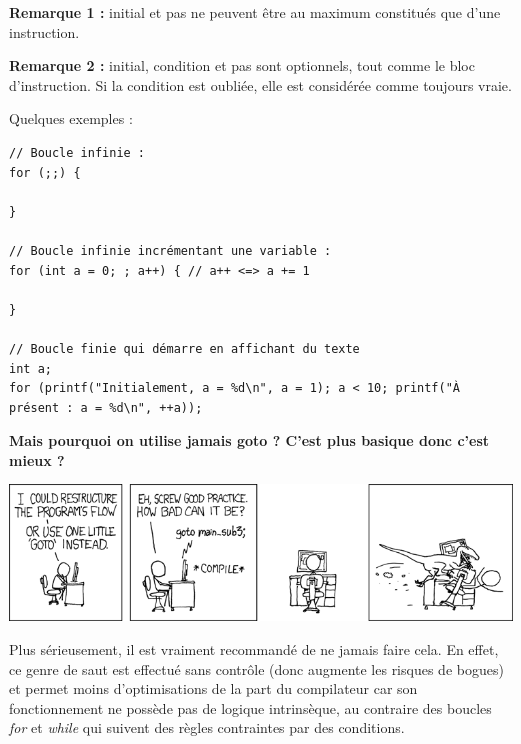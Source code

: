 \documentclass[../../../main.tex]{subfiles}
\begin{document}
\textbf{Remarque 1 :} \textsf{initial} et \textsf{pas} ne peuvent être au maximum constitués que d'une instruction.
 
\textbf{Remarque 2 :} \textsf{initial}, \textsf{condition} et \textsf{pas} sont optionnels, tout comme le bloc d'instruction. Si la condition est oubliée, elle est considérée comme toujours vraie.
 
Quelques exemples :
\begin{verbatim}
// Boucle infinie :
for (;;) {
	
}

// Boucle infinie incrémentant une variable :
for (int a = 0; ; a++) { // a++ <=> a += 1
	
}

// Boucle finie qui démarre en affichant du texte
int a;
for (printf("Initialement, a = %d\n", a = 1); a < 10; printf("À présent : a = %d\n", ++a));
\end{verbatim}
\textbf{Mais pourquoi on utilise jamais \textsf{goto} ? C'est plus basique donc c'est mieux ?}
 
\begin{minipage}{\textwidth}
	\begin{center}
		\includegraphics[width=\textwidth]{meme2}
	\end{center}
\end{minipage}
 
Plus sérieusement, il est vraiment recommandé de ne jamais faire cela. En effet, ce genre de saut est effectué sans contrôle (donc augmente les risques de bogues) et permet moins d'optimisations de la part du compilateur car son fonctionnement ne possède pas de logique intrinsèque, au contraire des boucles \textit{for} et \textit{while} qui suivent des règles contraintes par des conditions.
\end{document}
